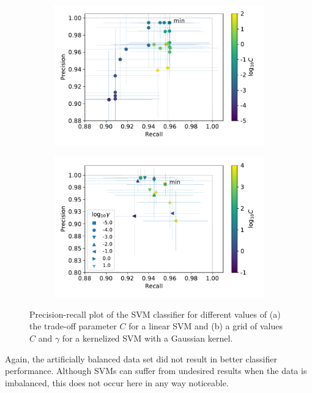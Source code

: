 \documentclass[12pt, a4paper]{scrartcl}
\begin{document}
\begin{figure}
	\centering
	 \begin{subfigure}[b]{0.45\textwidth}
	 	\includegraphics[width=\textwidth]{svm}
	 	\caption{}
	 	\label{fig:svm1}
    \end{subfigure}
	 \begin{subfigure}[b]{0.45\textwidth}
	 	\includegraphics[width=\textwidth]{svm_grid}
	 	\caption{}
	 	\label{fig:svm2}
    \end{subfigure}
	\caption{Precision-recall plot of the SVM classifier for different values of (a) the trade-off parameter $C$ for a linear SVM and (b) a grid of values $C$ and $\gamma$ for a kernelized SVM with a Gaussian kernel.}
	\label{fig:svm}
\end{figure}

Again, the artificially balanced data set did not result in better classifier performance. Although SVMs can suffer from undesired results when the data is imbalanced, this does not occur here in any way noticeable.
\end{document}
